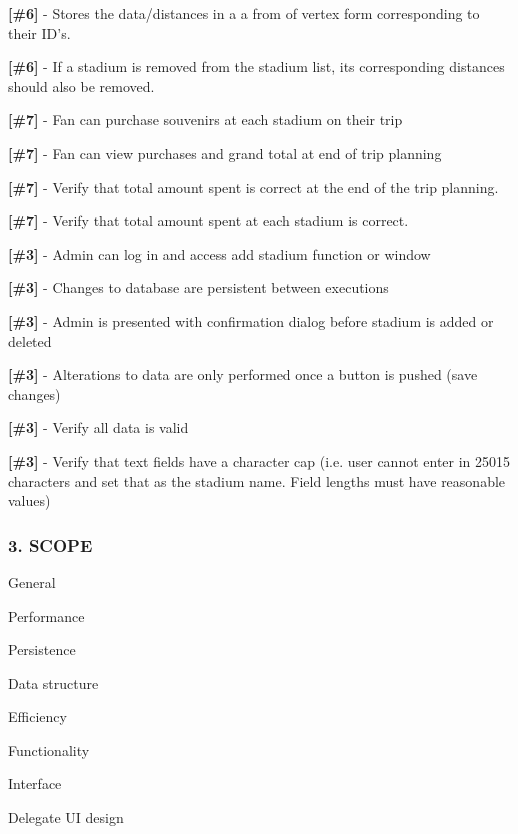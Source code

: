 {\bfseries \mbox{[}\#6\mbox{]}} -\/ Stores the data/distances in a a from of vertex form corresponding to their I\+D’s.

{\bfseries \mbox{[}\#6\mbox{]}} -\/ If a stadium is removed from the stadium list, its corresponding distances should also be removed.

{\bfseries \mbox{[}\#7\mbox{]}} -\/ Fan can purchase souvenirs at each stadium on their trip

{\bfseries \mbox{[}\#7\mbox{]}} -\/ Fan can view purchases and grand total at end of trip planning

{\bfseries \mbox{[}\#7\mbox{]}} -\/ Verify that total amount spent is correct at the end of the trip planning.

{\bfseries \mbox{[}\#7\mbox{]}} -\/ Verify that total amount spent at each stadium is correct.

{\bfseries \mbox{[}\#3\mbox{]}} -\/ Admin can log in and access add stadium function or window

{\bfseries \mbox{[}\#3\mbox{]}} -\/ Changes to database are persistent between executions

{\bfseries \mbox{[}\#3\mbox{]}} -\/ Admin is presented with confirmation dialog before stadium is added or deleted

{\bfseries \mbox{[}\#3\mbox{]}} -\/ Alterations to data are only performed once a button is pushed (save changes)

{\bfseries \mbox{[}\#3\mbox{]}} -\/ Verify all data is valid

{\bfseries \mbox{[}\#3\mbox{]}} -\/ Verify that text fields have a character cap (i.\+e. user cannot enter in 25015 characters and set that as the stadium name. Field lengths must have reasonable values)

\subsubsection*{3. S\+C\+O\+PE}


\begin{DoxyEnumerate}
\item General
\begin{DoxyEnumerate}
\item Performance
\item Persistence
\item Data structure
\item Efficiency
\item Functionality
\item Interface
\item Delegate UI design
\end{DoxyEnumerate}
\end{DoxyEnumerate}

